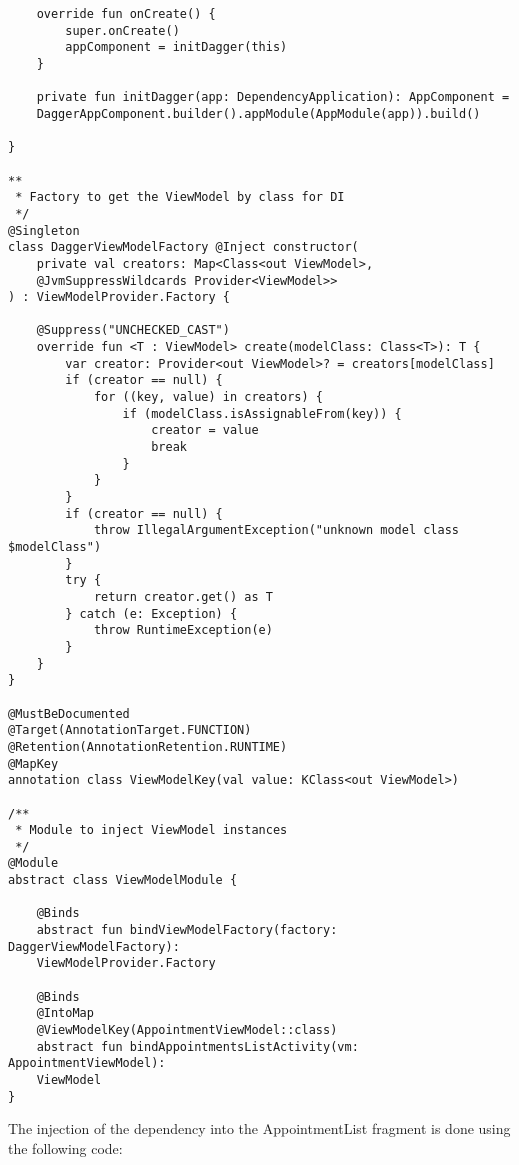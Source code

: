 \begin{verbatim}
    override fun onCreate() {
        super.onCreate()
        appComponent = initDagger(this)
    }

    private fun initDagger(app: DependencyApplication): AppComponent = 
    DaggerAppComponent.builder().appModule(AppModule(app)).build()

}

**
 * Factory to get the ViewModel by class for DI
 */
@Singleton
class DaggerViewModelFactory @Inject constructor(
    private val creators: Map<Class<out ViewModel>,
    @JvmSuppressWildcards Provider<ViewModel>>
) : ViewModelProvider.Factory {

    @Suppress("UNCHECKED_CAST")
    override fun <T : ViewModel> create(modelClass: Class<T>): T {
        var creator: Provider<out ViewModel>? = creators[modelClass]
        if (creator == null) {
            for ((key, value) in creators) {
                if (modelClass.isAssignableFrom(key)) {
                    creator = value
                    break
                }
            }
        }
        if (creator == null) {
            throw IllegalArgumentException("unknown model class $modelClass")
        }
        try {
            return creator.get() as T
        } catch (e: Exception) {
            throw RuntimeException(e)
        }
    }
}

@MustBeDocumented
@Target(AnnotationTarget.FUNCTION)
@Retention(AnnotationRetention.RUNTIME)
@MapKey
annotation class ViewModelKey(val value: KClass<out ViewModel>)

/**
 * Module to inject ViewModel instances
 */
@Module
abstract class ViewModelModule {

    @Binds
    abstract fun bindViewModelFactory(factory: DaggerViewModelFactory): 
    ViewModelProvider.Factory

    @Binds
    @IntoMap
    @ViewModelKey(AppointmentViewModel::class)
    abstract fun bindAppointmentsListActivity(vm: AppointmentViewModel): 
    ViewModel
}
\end{verbatim}
The injection of the dependency into the AppointmentList fragment is done using the following code:

